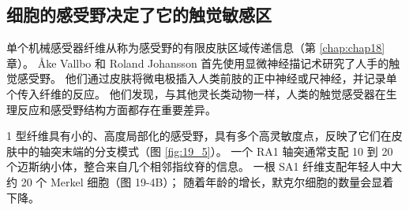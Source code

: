 \subsection{细胞的感受野决定了它的触觉敏感区}
单个机械感受器纤维从称为感受野的有限皮肤区域传递信息（第 \ref{chap:chap18} 章）。 
Åke Vallbo 和 Roland Johansson 首先使用显微神经描记术研究了人手的触觉感受野。 
他们通过皮肤将微电极插入人类前肢的正中神经或尺神经，并记录单个传入纤维的反应。 
他们发现，与其他灵长类动物一样，人类的触觉感受器在生理反应和感受野结构方面都存在重要差异。


1 型纤维具有小的、高度局部化的感受野，具有多个高灵敏度点，反映了它们在皮肤中的轴突末端的分支模式（图 \ref{fig:19_5}）。 
一个 RA1 轴突通常支配 10 到 20 个迈斯纳小体，整合来自几个相邻指纹脊的信息。 
一根 SA1 纤维支配年轻人中大约 20 个 Merkel 细胞（图 19-4B）； 随着年龄的增长，默克尔细胞的数量会显着下降。

